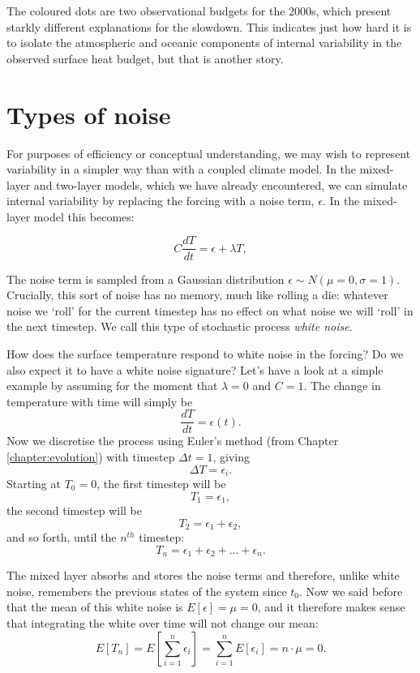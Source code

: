 \documentclass[12pt]{book}
\begin{document}
The coloured dots are two observational budgets for the 2000s, which present starkly different explanations for the slowdown. This indicates just how hard it is to isolate the atmospheric and oceanic components of internal variability in the observed surface heat budget, but that is another story.

\section{Types of noise}
For purposes of efficiency or conceptual understanding, we may wish to represent variability in a simpler way than with a coupled climate model. In the mixed-layer and two-layer models, which we have already encountered, we can simulate internal variability by replacing the forcing with a noise term, $\epsilon$. In the mixed-layer model this becomes:

\begin{equation}
C\frac{dT}{dt} = \epsilon + \lambda T,
\label{eq:mlo-var}
\end{equation}

The noise term is sampled from a Gaussian distribution $\epsilon \sim N(\mu=0,\sigma=1)$. Crucially, this sort of noise has no memory, much like rolling a die: whatever noise we `roll' for the current timestep has no effect on what noise we will `roll' in the next timestep. We call this type of stochastic process \textit{white noise}.

How does the surface temperature respond to white noise in the forcing? Do we also expect it to have a white noise signature? Let's have a look at a simple example by assuming for the moment that $\lambda = 0$ and $C=1$. The change in temperature with time will simply be $$\frac{dT}{dt} = \epsilon(t) .$$ Now we discretise the process using Euler's method (from Chapter \ref{chapter:evolution}) with timestep $\Delta t = 1$, giving $$\Delta T = \epsilon_i .$$  Starting at $T_0=0$,  the first timestep will be $$T_1 =\epsilon_1,$$  the second timestep will be  $$T_2 =\epsilon_1 + \epsilon_2 ,$$ and so forth, until the $n^{th}$ timestep: $$T_n =\epsilon_1 + \epsilon_2 + ... +  \epsilon_n.$$

The mixed layer absorbs and stores the noise terms and therefore, unlike white noise, remembers the previous states of the system since $t_0$. Now we said before that the mean of this white noise is $E[\epsilon]=\mu=0$, and it therefore makes sense that integrating the white over time will not change our mean: 
\begin{equation}
E[T_n] = E[\sum_{i=1}^n{\epsilon_i}] = \sum_{i=1}^n{E[\epsilon_i]} = n \cdot \mu = 0 .
\end{equation}
\end{document}
